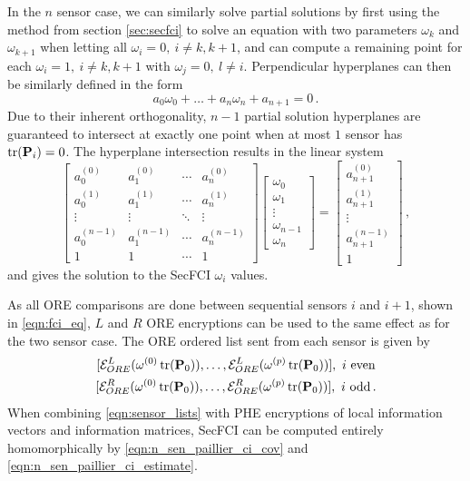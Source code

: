 \documentclass[letterpaper, 10 pt, conference]{ieeeconf}  %
\begin{document}
In the $n$ sensor case, we can similarly solve partial solutions by first using the method from section \ref{sec:secfci} to solve an equation with two parameters $\omega_k$ and $\omega_{k+1}$ when letting all $\omega_i=0,\ i\neq k,k+1$, and can compute a remaining point for each $\omega_i=1,\ i\neq k,k+1$ with $\omega_j=0,\ l\neq i$. Perpendicular hyperplanes can then be similarly defined in the form 
\begin{equation}
   a_0\omega_0 + \dots +a_n\omega_n + a_{n+1} = 0\,. \label{eqn:nsen_plane_eq}
\end{equation}
Due to their inherent orthogonality, $n-1$ partial solution hyperplanes are guaranteed to intersect at exactly one point when at most $1$ sensor has $\operatorname{tr}({{\mathbf{P}}}_i)=0$. The hyperplane intersection results in the linear system 
\begin{equation}
   \begin{bmatrix}
      a_0^{(0)} & a_1^{(0)} & \cdots & a_n^{(0)} \\
      a_0^{(1)} & a_1^{(1)} & \cdots & a_n^{(1)} \\
      \vdots & \vdots & \ddots & \vdots \\
      a_0^{(n-1)} & a_1^{(n-1)} & \cdots & a_n^{(n-1)} \\
      1 & 1 & \cdots & 1
   \end{bmatrix}
   \begin{bmatrix}
      \omega_0 \\
      \omega_1 \\
      \vdots \\
      \omega_{n-1} \\
      \omega_n
   \end{bmatrix}
   =
   \begin{bmatrix}
      a_{n+1}^{(0)} \\
      a_{n+1}^{(1)} \\
      \vdots \\
      a_{n+1}^{(n-1)} \\
      1
   \end{bmatrix}\,, \label{eqn:hyperplane_sol_eq}
\end{equation}
and gives the solution to the SecFCI $\omega_i$ values.

As all ORE comparisons are done between sequential sensors $i$ and $i+1$, shown in \eqref{eqn:fci_eq}, $L$ and $R$ ORE encryptions can be used to the same effect as for the two sensor case. The ORE ordered list sent from each sensor is given by
\begin{equation}
   \begin{gathered} \label{eqn:sensor_lists}
      [\mathcal{E}^L_{ORE}(\omega^{(0)}\tr(\mP_0)),\dots,\mathcal{E}^L_{ORE}(\omega^{(p)}\tr(\mP_0))],\ i\text{ even} \\
      [\mathcal{E}^R_{ORE}(\omega^{(0)}\tr(\mP_0)),\dots,\mathcal{E}^R_{ORE}(\omega^{(p)}\tr(\mP_0))],\ i\text{ odd}\,.
   \end{gathered}
\end{equation}
When combining \eqref{eqn:sensor_lists} with PHE encryptions of local information vectors and information matrices, SecFCI can be computed entirely homomorphically by \eqref{eqn:n_sen_paillier_ci_cov} and \eqref{eqn:n_sen_paillier_ci_estimate}.
\end{document}

